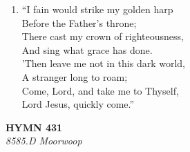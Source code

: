 \documentclass[11pt,a4paper]{article}
\begin{document}
\begin{enumerate}
    \item ``I fain would strike my golden harp \\
        Before the Father's throne; \\
        There cast my crown of righteousness, \\
        And sing what grace has done. \\
        'Then leave me not in this dark world, \\
        A stranger long to roam; \\
        Come, Lord, and take me to Thyself, \\
        Lord Jesus, quickly come.''

\end{enumerate}

\newpage
\begin{center}
    {\Large \textbf{HYMN 431}}
    \\
    \textit{8585.D Moorwoop}
\end{center}
\vspace{1em}
\end{document}
